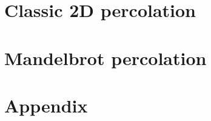 


\cleardoublepage %

\cleardoublepage %

\pagestyle{scrheadings} %

\cleardoublepage %

\cleardoublepage


\cleardoublepage %



\part{Classic 2D percolation} %

 
 

\part{Mandelbrot percolation}
 





\cleardoublepage %

\part{Appendix}
\appendix
 


\cleardoublepage %



